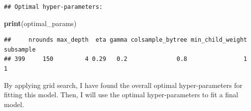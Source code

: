 \documentclass[
]{article}
\newenvironment{Shaded}{\begin{snugshade}}{\end{snugshade}}
\newcommand{\FunctionTok}[1]{\textcolor[rgb]{0.13,0.29,0.53}{\textbf{#1}}}
\newcommand{\NormalTok}[1]{#1}
\begin{document}
\begin{verbatim}
## Optimal hyper-parameters:
\end{verbatim}

\begin{Shaded}
\begin{Highlighting}[]
\FunctionTok{print}\NormalTok{(optimal\_params)}
\end{Highlighting}
\end{Shaded}

\begin{verbatim}
##     nrounds max_depth  eta gamma colsample_bytree min_child_weight subsample
## 399     150         4 0.29   0.2              0.8                1         1
\end{verbatim}

By applying grid search, I have found the overall optimal
hyper-parameters for fitting this model. Then, I will use the optimal
hyper-parameters to fit a final model.
\end{document}

